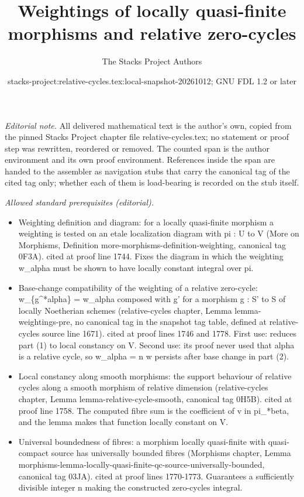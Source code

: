 \documentclass{stacks-project}
\title{Weightings of locally quasi-finite morphisms and relative zero-cycles}
\author{The Stacks Project Authors}
\date{stacks-project:relative-cycles.tex:local-snapshot-20261012; GNU FDL 1.2 or later}
\theoremstyle{plain}
\theoremstyle{definition}
\theoremstyle{remark}
\numberwithin{equation}{subsection}
\begin{document}
\maketitle
\setcounter{subsection}{1}
\noindent\textit{Editorial note.} All delivered mathematical text is the author's own, copied from the pinned Stacks Project chapter file relative-cycles.tex; no statement or proof step was rewritten, reordered or removed. The counted span is the author environment and its own proof environment. References inside the span are handed to the assembler as navigation stubs that carry the canonical tag of the cited tag only; whether each of them is load-bearing is recorded on the stub itself.\par\medskip
\noindent\textit{Allowed standard prerequisites (editorial).}\begin{itemize}
\item Weighting definition and diagram: for a locally quasi-finite morphism a weighting is tested on an etale localization diagram with pi : U to V (More on Morphisms, Definition more-morphisms-definition-weighting, canonical tag 0F3A). cited at proof line 1744. Fixes the diagram in which the weighting w\_alpha must be shown to have locally constant integral over pi.
\item Base-change compatibility of the weighting of a relative zero-cycle: w\_\{g\textasciicircum{}*alpha\} = w\_alpha composed with g' for a morphism g : S' to S of locally Noetherian schemes (relative-cycles chapter, Lemma lemma-weightings-pre, no canonical tag in the snapshot tag table, defined at relative-cycles source line 1671). cited at proof lines 1746 and 1778. First use: reduces part (1) to local constancy on V. Second use: its proof never used that alpha is a relative cycle, so w\_alpha = n w persists after base change in part (2).
\item Local constancy along smooth morphisms: the support behaviour of relative cycles along a smooth morphism of relative dimension (relative-cycles chapter, Lemma lemma-relative-cycle-smooth, canonical tag 0H5B). cited at proof line 1758. The computed fibre sum is the coefficient of v in pi\_*beta, and the lemma makes that function locally constant on V.
\item Universal boundedness of fibres: a morphism locally quasi-finite with quasi-compact source has universally bounded fibres (Morphisms chapter, Lemma morphisms-lemma-locally-quasi-finite-qc-source-universally-bounded, canonical tag 03JA). cited at proof lines 1770-1773. Guarantees a sufficiently divisible integer n making the constructed zero-cycles integral.

\end{itemize}
\end{document}
